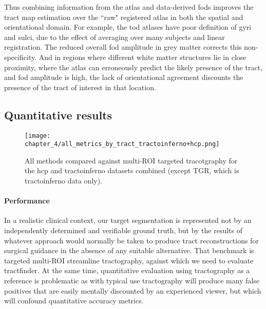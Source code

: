 Thus combining information from the atlas and data-derived \gls{fod}s improves the tract map estimation over the ``raw" registered atlas in both the spatial and orientational domain. For example, the \gls{tod} atlases have poor definition of gyri and sulci, due to the effect of averaging over many subjects and linear registration. The reduced overall \gls{fod} amplitude in grey matter corrects this non-specificity. And in regions where different white matter structures lie in close proximity, where the atlas can erroneously predict the likely presence of the tract, and \gls{fod} amplitude is high, the lack of orientational agreement discounts the presence of the tract of interest in that location.

\subsection{Quantitative results}

\begin{figure}[h!]
  \centering
  \texttt{[image: chapter\_4/all\_metrics\_by\_tract\_tractoinferno+hcp.png]}
  \caption{All methods compared against multi-ROI targeted tracotgraphy for the hcp and tractoinferno datasets combined (except TGR, which is tractoinferno data only). }
  \label{fig:combobox}
\end{figure}

\paragraph*{Performance}

In a realistic clinical context, our target segmentation is represented not by an independently determined and verifiable ground truth, but by the results of whatever approach would normally be taken to produce tract reconstructions for surgical guidance in the absence of any suitable alternative.
That benchmark is targeted multi-ROI streamline tractography, against which we need to evaluate tractfinder.
At the same time, quantitative evaluation using tractography as a reference is problematic as with typical use tractography will produce many false positives that are easily mentally discounted by an experienced viewer, but which will confound quantitative accuracy metrics.


